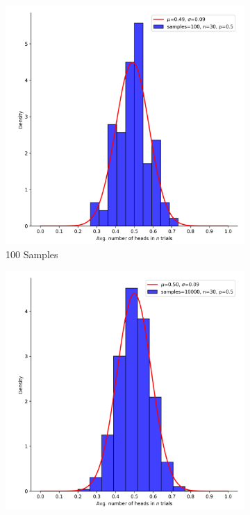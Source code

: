 \begin{figure}[htbp]
      \centering
      \begin{subfigure}{0.49\textwidth}
            \centering
            \includegraphics[width=\textwidth]{images/coin_flip_samples_100.pdf}
            \caption{100 Samples}
            \label{fig:probability:probability_distributions:bernoulli:coin_100}
      \end{subfigure}
      \begin{subfigure}{0.49\textwidth}
            \centering
            \includegraphics[width=\textwidth]{images/coin_flip_samples_10000.pdf}

\end{subfigure}
\end{figure}
